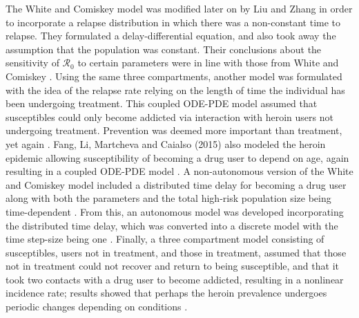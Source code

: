\documentclass[12pt]{article}
\begin{document}

The White and Comiskey model was modified later on by Liu and Zhang in order to incorporate a relapse distribution in which there was a non-constant time to relapse. They formulated a delay-differential equation, and also took away the assumption that the population was constant. Their conclusions about the sensitivity of $\mathscr{R}_0$ to certain parameters were in line with those from White and Comiskey \cite{Liu}. Using the same three compartments, another model was formulated with the idea of the relapse rate relying on the length of time the individual has been undergoing treatment. This coupled ODE-PDE model assumed that susceptibles could only become addicted via interaction with heroin users not undergoing treatment. Prevention was deemed more important than treatment, yet again \cite{Fang1}. Fang, Li, Martcheva and Caialso (2015) also modeled the heroin epidemic allowing susceptibility of becoming a drug user to depend on age, again resulting in a coupled ODE-PDE model \cite{Fang2}. A non-autonomous version of the White and Comiskey model included a distributed time delay for becoming a drug user along with both the parameters and the total high-risk population size being time-dependent \cite{Samanta}. From this, an autonomous model was developed incorporating the distributed time delay, which was converted into a discrete model with the time step-size being one \cite{Abdurahman}. Finally, a three compartment model consisting of susceptibles, users not in treatment, and those in treatment, assumed that those not in treatment could not recover and return to being susceptible, and that it took two contacts with a drug user to become addicted, resulting in a nonlinear incidence rate; results showed that perhaps the heroin prevalence undergoes periodic changes depending on conditions \cite{Ma}. 
\end{document}
